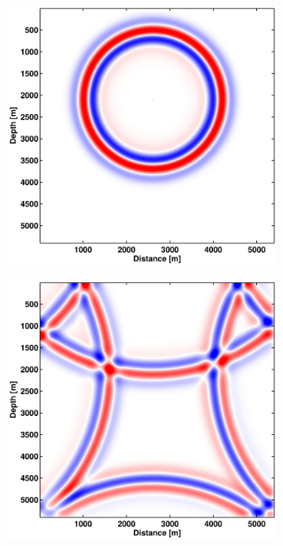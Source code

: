 \begin{figure}[ht!]
\centering
    \begin{subfigure}[b]{0.45\textwidth}
        \centering
        \includegraphics[width=\textwidth]{figures/homogenous_grid_n_16_5.pdf}
        \caption{}
    \end{subfigure}
    \hfill
    \begin{subfigure}[b]{0.45\textwidth}
        \centering
        \includegraphics[width=\textwidth]{figures/homogenous_grid_n_16_10.pdf}

\end{subfigure}
\end{figure}
